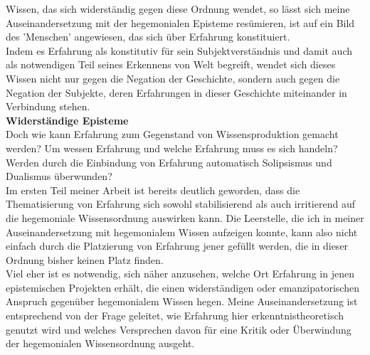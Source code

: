 Wissen, das sich widerständig gegen diese Ordnung wendet, so lässt sich meine
Auseinandersetzung mit der hegemonialen Episteme resümieren, ist auf ein Bild
des 'Menschen' angewiesen, das sich über Erfahrung konstituiert. \\
Indem es
Erfahrung als konstitutiv für sein Subjektverständnis und damit auch als
notwendigen Teil seines Erkennens von Welt begreift, wendet sich dieses Wissen
nicht nur gegen die Negation der Geschichte, sondern auch gegen die Negation der
Subjekte, deren Erfahrungen in dieser Geschichte miteinander in Verbindung
stehen.\\ 

\textbf{\large Widerständige Episteme}\\

Doch wie kann Erfahrung zum Gegenstand von Wissensproduktion gemacht werden? Um
wessen Erfahrung und welche Erfahrung muss es sich handeln? Werden durch die
Einbindung von Erfahrung automatisch Solipsismus und Dualismus überwunden?
\\

Im
ersten Teil meiner Arbeit ist bereits deutlich geworden, dass die Thematisierung
von Erfahrung sich sowohl stabilisierend als auch irritierend auf die
hegemoniale Wissensordnung auswirken kann. Die Leerstelle, die ich in meiner
Auseinandersetzung mit hegemonialem Wissen aufzeigen konnte, kann also nicht
einfach durch die Platzierung von Erfahrung jener gefüllt werden, die in dieser
Ordnung bisher keinen Platz finden. \\
Viel eher ist es notwendig, sich näher
anzusehen, welche Ort Erfahrung in jenen epistemischen Projekten erhält, die
einen widerständigen oder emanzipatorischen Anspruch gegenüber hegemonialem
Wissen hegen. Meine Auseinandersetzung ist entsprechend von der Frage geleitet,
wie Erfahrung hier erkenntnistheoretisch genutzt wird und welches Versprechen
davon für eine Kritik oder Überwindung der hegemonialen Wissensordnung ausgeht.


